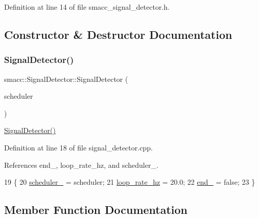 Definition at line 14 of file smacc\+\_\+signal\+\_\+detector.\+h.



\subsection{Constructor \& Destructor Documentation}
\mbox{\label{classsmacc_1_1SignalDetector_a24914014feb0ab01e2452af705ef2774}} 
\subsubsection{\texorpdfstring{Signal\+Detector()}{SignalDetector()}}
{\footnotesize\ttfamily smacc\+::\+Signal\+Detector\+::\+Signal\+Detector (\begin{DoxyParamCaption}\item[{\hyperlink{smacc__fifo__scheduler_8h_a0063e275231c80d5f97df21d17257bf7}{Smacc\+Fifo\+Scheduler} $\ast$}]{scheduler }\end{DoxyParamCaption})}

\hyperlink{classsmacc_1_1SignalDetector_a24914014feb0ab01e2452af705ef2774}{Signal\+Detector()} 

Definition at line 18 of file signal\+\_\+detector.\+cpp.



References end\+\_\+, loop\+\_\+rate\+\_\+hz, and scheduler\+\_\+.


\begin{DoxyCode}
19 \{
20     \hyperlink{classsmacc_1_1SignalDetector_adaee5b9b91d0e6305dc1ab30f7ab566d}{scheduler\_} = scheduler;
21     \hyperlink{classsmacc_1_1SignalDetector_a41a2ae4262ed350f46d8b886bdc1dfa5}{loop\_rate\_hz} = 20.0;
22     \hyperlink{classsmacc_1_1SignalDetector_aaee266393c01693528a2d74b1f2354a2}{end\_} = \textcolor{keyword}{false};
23 \}
\end{DoxyCode}


\subsection{Member Function Documentation}
\mbox{\label{classsmacc_1_1SignalDetector_a47ec2df560e2e33758ce3975bece9385}} 
